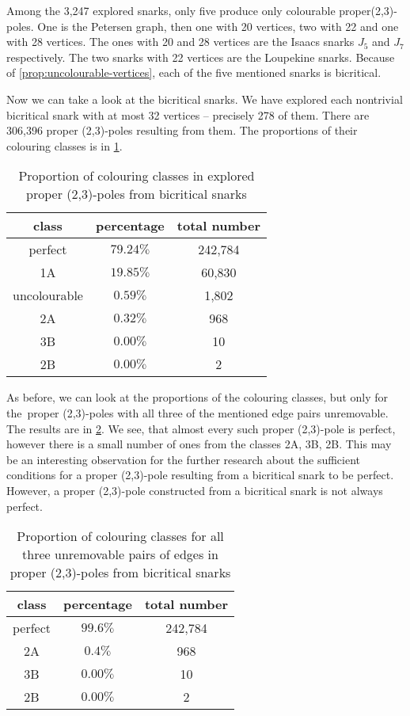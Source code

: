 Among the 3,247 explored snarks, only five produce only colourable proper\linebreak (2,3)-poles. One is the Petersen graph, then one with 20 vertices, two with 22 and one with 28 vertices. The ones with 20 and 28 vertices are the Isaacs snarks $J_5$ and $J_7$ respectively. The two snarks with 22 vertices are the Loupekine snarks. Because of \cref{prop:uncolourable-vertices}, each of the five mentioned snarks is bicritical.

Now we can take a look at the bicritical snarks. We have explored each nontrivial bicritical snark with at most 32 vertices -- precisely 278 of them. There are 306,396 proper (2,3)-poles resulting from them. The proportions of their colouring classes is in \cref{tab:proportion-bicritical}.

\begin{table}[h!]
	\centering
	\begin{tabular}{ |c|c|c| } 
		\hline
		class & percentage & total number \\ [0.5ex] 
		\hline\hline
		perfect & $79.24\%$ & 242,784 \\ 
		\hline
		1A & $19.85\%$ & 60,830 \\ 
		\hline
		uncolourable & $0.59\%$ & 1,802 \\ 
		\hline
		2A & $0.32\%$ & 968 \\ 
		\hline
		3B & $0.00\%$ & 10 \\ 
		\hline
		2B & $0.00\%$ & 2 \\ 
		\hline
	\end{tabular}
	\caption{Proportion of colouring classes in explored proper (2,3)-poles from bicritical snarks}
	\label{tab:proportion-bicritical}
\end{table}

As before, we can look at the proportions of the colouring classes, but only for the~proper (2,3)-poles with all three of the mentioned edge pairs unremovable. The results are in \cref{tab:proportion-bicritical-all-unremovable}. We see, that almost every such proper (2,3)-pole is perfect, however there is a small number of ones from the classes 2A, 3B, 2B. This may be an interesting observation for the further research about the sufficient conditions for a proper (2,3)-pole resulting from a bicritical snark to be perfect. However, a proper (2,3)-pole constructed from a bicritical snark is not always perfect.

\begin{table}[h!]
	\centering
	\begin{tabular}{ |c|c|c| } 
		\hline
		class & percentage & total number \\ [0.5ex] 
		\hline\hline
		perfect & $99.6\%$ & 242,784 \\ 
		\hline
		2A & $0.4\%$ & 968 \\ 
		\hline
		3B & $0.00\%$ & 10 \\ 
		\hline
		2B & $0.00\%$ & 2 \\ 
		\hline
	\end{tabular}
	\caption{Proportion of colouring classes for all three unremovable pairs of edges in proper (2,3)-poles from bicritical snarks}
	\label{tab:proportion-bicritical-all-unremovable}
\end{table}